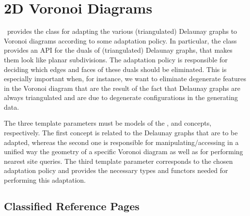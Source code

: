 

\chapter{2D Voronoi Diagrams}
\label{ref-chapter-vda2}


\cgal\ provides the class  for
adapting the various (triangulated) Delaunay graphs to Voronoi
diagrams according to some adaptation policy.
In particular, the class 
provides an API for the duals of (triangulated) Delaunay graphs, that
makes them look like planar subdivisions. The adaptation policy is
responsible for deciding which edges and faces of these duals should
be eliminated. This is especially important when, for instance, we
want to eliminate degenerate features in the Voronoi diagram that are
the result of the fact that Delaunay graphs are always triangulated
and are due to degenerate configurations in the generating data.

The three template parameters must be models of the
,  and
 concepts, respectively.
The first concept is related to the Delaunay graphs that are to be
adapted, whereas the second one is responsible for
manipulating/accessing in a unified way the geometry of a specific
Voronoi diagram as well as for performing nearest site queries. 
The third template parameter corresponds to the chosen adaptation
policy and provides the necessary types and functors needed for
performing this adaptation.

\section{Classified Reference Pages}

